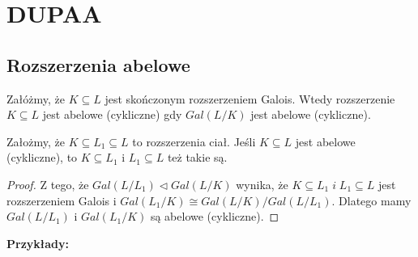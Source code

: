 \section{DUPAA}
\subsection{Rozszerzenia abelowe}
\setcounter{theorem}{2}

\begin{bbox}
Załóżmy, że $K\subseteq L$ jest skończonym rozszerzeniem Galois. Wtedy rozszerzenie $K\subseteq L$ jest abelowe (cykliczne) gdy $Gal(L/K)$ jest abelowe (cykliczne).
\end{bbox}

\begin{theorem}
    Założmy, że $K\subseteq L_1\subseteq L$ to rozszerzenia ciał. Jeśli $K\subseteq L$ jest abelowe (cykliczne), to $K\subseteq L_1$ i $L_1\subseteq L$ też takie są.
\end{theorem}
\begin{proof}
Z tego, że $Gal(L/L_1)\triangleleft Gal(L/K)$ wynika, że $K\subseteq L_1\;i\;L_1\subseteq L$ jest rozszerzeniem Galois i $Gal(L_1/K)\cong Gal(L/K)/Gal(L/L_1)$. Dlatego mamy $Gal(L/L_1)$ i $Gal(L_1/K)$ są abelowe (cykliczne).
\end{proof}

\textbf{Przykłady:}

